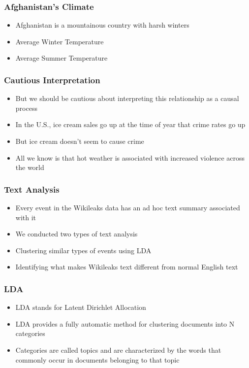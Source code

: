 \documentclass[xcolor=dvipsnames, 9pt]{beamer}
\begin{document}
\begin{frame}[fragile]
  \frametitle{Afghanistan's Climate}
  \begin{itemize}
    \item{Afghanistan is a mountainous country with harsh winters}
    \item{Average Winter Temperature}
    \item{Average Summer Temperature}
  \end{itemize}
\end{frame}


\begin{frame}[fragile]
  \frametitle{Cautious Interpretation}
  \begin{itemize}
    \item{But we should be cautious about interpreting this relationship as a causal process}
    \item{In the U.S., ice cream sales go up at the time of year that crime rates go up}
    \item{But ice cream doesn't seem to cause crime}
    \item{All we know is that hot weather is associated with increased violence across the world}
  \end{itemize}
\end{frame}

\begin{frame}[fragile]
  \frametitle{Text Analysis}
  
  \begin{itemize}
    \item{Every event in the Wikileaks data has an ad hoc text summary associated with it}
    \item{We conducted two types of text analysis}
    \item{Clustering similar types of events using LDA}
    \item{Identifying what makes Wikileaks text different from normal English text}
  \end{itemize}
\end{frame}

\begin{frame}[fragile]
  \frametitle{LDA}
  \begin{itemize}
    \item{LDA stands for Latent Dirichlet Allocation}
    \item{LDA provides a fully automatic method for clustering documents into N categories}
    \item{Categories are called topics and are characterized by the words that commonly occur in documents belonging to that topic}
  \end{itemize}
\end{frame}
\end{document}
